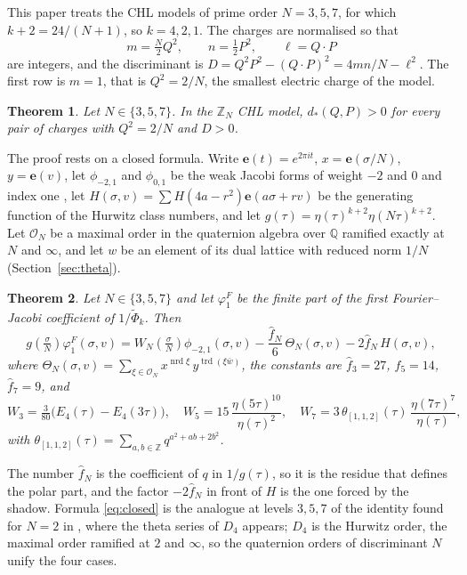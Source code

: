 \documentclass[mathematics,article,submit,pdftex,oneauthor]{Definitions/mdpi}
\numberwithin{equation}{section}
\theoremstyle{plain}
\newtheorem{thm}{Theorem}[section]
\theoremstyle{remark}
\newcommand{\Z}{\mathbb{Z}}
\newcommand{\Q}{\mathbb{Q}}
\newcommand{\cO}{\mathcal{O}}
\newcommand{\e}{\mathbf{e}}
\newcommand{\pmi}{\phi_{-2,1}}
\newcommand{\pz}{\phi_{0,1}}
\newcommand{\tPhi}{\widetilde{\Phi}}
\begin{document}
This paper treats the CHL models of prime order $N=3,5,7$, for which $k+2=24/(N+1)$, so $k=4,2,1$. The charges are normalised so that
\begin{equation}\label{eq:charges}
m=\tfrac{N}{2}Q^2,\qquad n=\tfrac12P^2,\qquad \ell=Q\cdot P
\end{equation}
are integers, and the discriminant is $D=Q^2P^2-(Q\cdot P)^2=4mn/N-\ell^2$. The first row is $m=1$, that is $Q^2=2/N$, the smallest electric charge of the model.

\begin{thm}\label{thm:main}
Let $N\in\{3,5,7\}$. In the $\Z_N$ CHL model, $d_*(Q,P)>0$ for every pair of charges with $Q^2=2/N$ and $D>0$.
\end{thm}

The proof rests on a closed formula. Write $\e(t)=e^{2\pi i t}$, $x=\e(\sigma/N)$, $y=\e(v)$, let $\pmi$ and $\pz$ be the weak Jacobi forms of weight $-2$ and $0$ and index one \cite[\S9]{EZ85}, let $H(\sigma,v)=\sum H(4a-r^2)\e(a\sigma+rv)$ be the generating function of the Hurwitz class numbers, and let $g(\tau)=\eta(\tau)^{k+2}\eta(N\tau)^{k+2}$. Let $\cO_N$ be a maximal order in the quaternion algebra over $\Q$ ramified exactly at $N$ and $\infty$, and let $w$ be an element of its dual lattice with reduced norm $1/N$ (Section~\ref{sec:theta}).

\begin{thm}\label{thm:closed}
Let $N\in\{3,5,7\}$ and let $\varphi^F_1$ be the finite part of the first Fourier--Jacobi coefficient of $1/\tPhi_k$. Then
\begin{equation}\label{eq:closed}
g\!\left(\tfrac{\sigma}{N}\right)\varphi^F_1(\sigma,v)=W_N\!\left(\tfrac{\sigma}{N}\right)\pmi(\sigma,v)-\frac{\hat f_N}{6}\,\Theta_N(\sigma,v)-2\hat f_N\,H(\sigma,v),
\end{equation}
where $\Theta_N(\sigma,v)=\sum_{\xi\in\cO_N}x^{\operatorname{nrd}\xi}\,y^{\operatorname{trd}(\xi\bar w)}$, the constants are $\hat f_3=27$, $\hat f_5=14$, $\hat f_7=9$, and
\begin{equation}\label{eq:WN}
W_3=\tfrac{3}{80}\bigl(E_4(\tau)-E_4(3\tau)\bigr),\quad
W_5=15\,\frac{\eta(5\tau)^{10}}{\eta(\tau)^2},\quad
W_7=3\,\theta_{[1,1,2]}(\tau)\,\frac{\eta(7\tau)^7}{\eta(\tau)},
\end{equation}
with $\theta_{[1,1,2]}(\tau)=\sum_{a,b\in\Z}q^{a^2+ab+2b^2}$.
\end{thm}

The number $\hat f_N$ is the coefficient of $q$ in $1/g(\tau)$, so it is the residue that defines the polar part, and the factor $-2\hat f_N$ in front of $H$ is the one forced by the shadow. Formula \eqref{eq:closed} is the analogue at levels $3,5,7$ of the identity found for $N=2$ in \cite{Bha26a}, where the theta series of $D_4$ appears; $D_4$ is the Hurwitz order, the maximal order ramified at $2$ and $\infty$, so the quaternion orders of discriminant $N$ unify the four cases.
\end{document}
